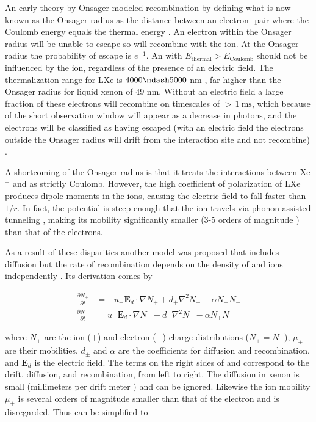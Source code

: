 An early theory by Onsager modeled recombination by defining what is now known as the Onsager radius as the distance between an
electron- pair where the Coulomb energy equals the \electron thermal energy .  An electron within the
Onsager radius will be unable to escape so will recombine with the ion.  At the Onsager radius the probability of escape is $e^{-1}$.  An
\electron
with $E_{\mathrm{thermal}} > E_{\mathrm{Coulomb}}$ should not be influenced by the ion, regardless of the presence of an electric
field.  The thermalization range for LXe is $4000 \mdash 5000$ nm , far higher than the Onsager radius for liquid
xenon of $49$ nm.  Without an electric field a large fraction of these electrons will recombine on
timescales of ${>}\, 1\ \mathrm{ms}$, which because of the short observation window will appear as a decrease in photons, and the electrons
will be classified as having escaped (with an electric field the electrons outside the Onsager radius will drift from the interaction site
and not recombine) .

A shortcoming of the Onsager radius is that it treats the interactions between Xe$^{+}$ and \electron as strictly Coulomb.  However,
the high coefficient of polarization of LXe produces dipole moments in the ions, causing the electric field to fall faster than
$1/r$.  In fact, the potential is steep enough that the ion travels via phonon-assisted tunneling , making its
mobility significantly smaller (3-5 orders of magnitude ) than that of the electrons.

As a result of these disparities another model was proposed that includes diffusion but the rate of
recombination depends on
the density of \electron and ions independently .  Its derivation comes by

\begin{subequations}
\begin{align}
\frac{\partial N_{+}}{\partial t} &= -u_{+} \mathbf{E}_d \cdot \nabla N_{+} + d_{+} \nabla^{2} N_{+} - \alpha N_{+} N_{-}
\label{eq:diff_plus} \\
\frac{\partial N_{-}}{\partial t} &= u_{-} \mathbf{E}_d \cdot \nabla N_{-} + d_{-} \nabla^{2} N_{-} - \alpha N_{+} N_{-}
\label{eq:diff_minus}
\end{align}
\label{eq:diff_plus_mins}
\end{subequations}

\noindent where $N_{\pm}$ are the ion ($+$) and electron ($-$) charge distributions ($N_+ = N_-$), $\mu_{\pm}$ are their mobilities,
$d_{\pm}$ and $\alpha$
are the coefficients for diffusion and recombination, and $\mathbf{E}_d$ is the electric field.  The terms on the right sides of
 and  correspond to the drift, diffusion, and recombination, from left to right.  The
diffusion in xenon is small (millimeters per drift meter ) and can be ignored.  Likewise the ion mobility $\mu_{+}$
is several orders of magnitude smaller than that
of the electron and is disregarded.  Thus  can be simplified to

